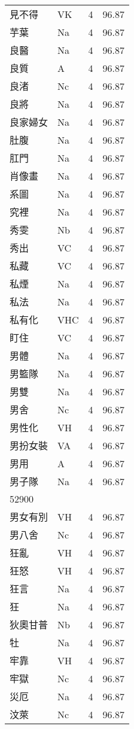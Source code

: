 \documentclass[twocolumn]{book}
\begin{document}
\begin{supertabular}{llrr}
見不得 & VK & 4 &  96.87\\
芋葉 & Na & 4 &  96.87\\
良醫 & Na & 4 &  96.87\\
良質 & A & 4 &  96.87\\
良渚 & Nc & 4 &  96.87\\
良將 & Na & 4 &  96.87\\
良家婦女 & Na & 4 &  96.87\\
肚腹 & Na & 4 &  96.87\\
肛門 & Na & 4 &  96.87\\
肖像畫 & Na & 4 &  96.87\\
系圖 & Na & 4 &  96.87\\
究裡 & Na & 4 &  96.87\\
秀雯 & Nb & 4 &  96.87\\
秀出 & VC & 4 &  96.87\\
私藏 & VC & 4 &  96.87\\
私煙 & Na & 4 &  96.87\\
私法 & Na & 4 &  96.87\\
私有化 & VHC & 4 &  96.87\\
盯住 & VC & 4 &  96.87\\
男體 & Na & 4 &  96.87\\
男籃隊 & Na & 4 &  96.87\\
男雙 & Na & 4 &  96.87\\
男舍 & Nc & 4 &  96.87\\
男性化 & VH & 4 &  96.87\\
男扮女裝 & VA & 4 &  96.87\\
男用 & A & 4 &  96.87\\
男子隊 & Na & 4 &  96.87\\
52900\\
男女有別 & VH & 4 &  96.87\\
男八舍 & Nc & 4 &  96.87\\
狂亂 & VH & 4 &  96.87\\
狂怒 & VH & 4 &  96.87\\
狂言 & Na & 4 &  96.87\\
狂 & Na & 4 &  96.87\\
狄奧甘普 & Nb & 4 &  96.87\\
牡 & Na & 4 &  96.87\\
牢靠 & VH & 4 &  96.87\\
牢獄 & Nc & 4 &  96.87\\
災厄 & Na & 4 &  96.87\\
汶萊 & Nc & 4 &  96.87\\

\end{supertabular}
\end{document}
